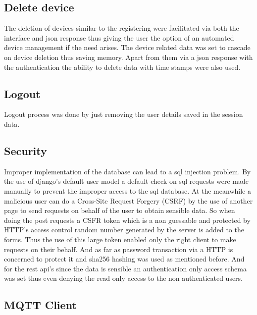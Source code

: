 \documentclass{report}
\begin{document}
\subsection{Delete device}                
    The deletion of devices similar to the registering were facilitated via both the interface and json response thus giving the user the option of an automated device management if the need arises. The device related data was set to cascade on device deletion thus saving memory. Apart from them via a json response with the authentication the ability to delete data with time stamps were also used. 
\subsection{Logout}                
    Logout process was done by just removing  the user details saved in the session data. %
    


\subsection{Security}               

    Improper implementation of the database can lead to a sql injection problem. By the use of django's default user model a default check on sql requests were made manually to prevent the improper access to the sql database. At the meanwhile a malicious user can do a Cross-Site Request Forgery (CSRF) by the use of another page to send requests on behalf of the user to obtain sensible data. So when doing the post requests a CSFR token which is a non guessable and protected by HTTP's access control random number generated by the server is added to the forms. Thus the use of this large token enabled only the right client to make requests on their behalf. And as far as password transaction via a HTTP is concerned to protect it and sha256 hashing was used as mentioned before. And for the rest api's since the data is sensible an authentication only access schema was set thus even denying the read only access to the non authenticated users.

\subsection{MQTT Client}              
\end{document}

